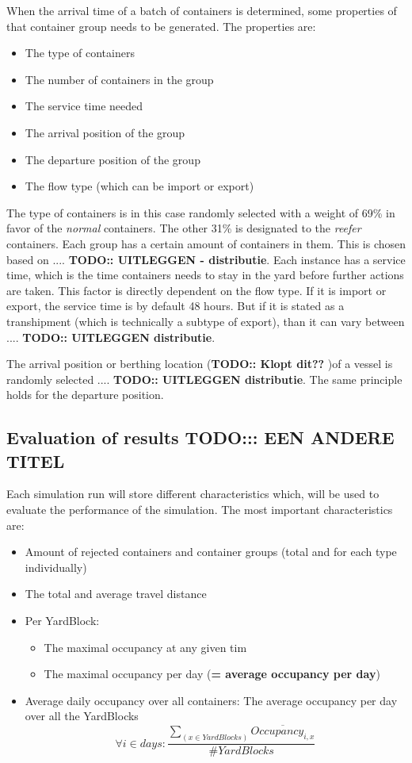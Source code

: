 \documentclass[]{article}
\begin{document}
When the arrival time of a batch of containers is determined, some properties
of that container group needs to be generated. The properties are: 
\begin{itemize}
	\item The type of containers
	\item The number of containers in the group
	\item The service time needed
	\item The arrival position of the group
	\item The departure position of the group
	\item The flow type (which can be import or export)
\end{itemize}

The type of containers is in this case randomly selected with a weight of 69\%
in favor of the \textit{normal} containers. The other 31\% is designated to the
\textit{reefer} containers. Each group has a certain amount of containers in
them. This is chosen based on .... \textbf{TODO:: UITLEGGEN - distributie}.
Each instance has a service time, which is the time containers needs to stay in
the yard before further actions are taken. This factor is directly dependent on
the flow type. If it is import or export, the service time is by default 48
hours. But if it is stated as a transhipment (which is technically a subtype of
export), than it can vary between .... \textbf{TODO:: UITLEGGEN \-
	distributie}.

The arrival position or berthing location (\textbf{TODO:: Klopt dit??} )of a
vessel is randomly selected .... \textbf{TODO:: UITLEGGEN \- distributie}. The
same principle holds for the departure position.

\subsection{Evaluation of results \Large TODO::: EEN ANDERE TITEL}
Each simulation run will store different characteristics which, will be used to
evaluate the performance of the simulation. The most important characteristics
are: \begin{itemize}
	\item Amount of rejected containers and container groups (total and for each type
	      individually)
	\item The total and average travel distance
	\item Per YardBlock:
	      \begin{itemize}
		      \item The maximal occupancy at any given tim
		      \item The maximal occupancy per day (\textbf{= average occupancy per day})
	      \end{itemize}
	\item Average daily occupancy over all containers: The average occupancy per day over
	      all the YardBlocks \[\forall i \in days: \frac{\sum_{(x \in YardBlocks)}
			      \overline{Occupancy_{i,x}}}{\#YardBlocks}\]
\end{itemize}
\end{document}
